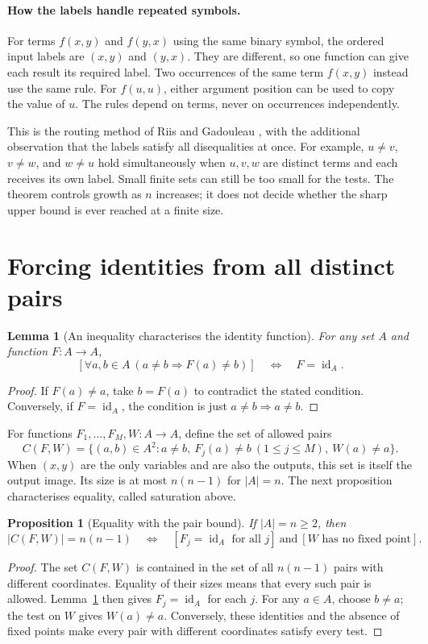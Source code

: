 \documentclass[12pt]{article}
\newtheorem{lemma}[theorem]{Lemma}
\newtheorem{proposition}[theorem]{Proposition}
\theoremstyle{definition}
\newcommand{\id}{\operatorname{id}}
\begin{document}
\paragraph{How the labels handle repeated symbols.}
For terms $f(x,y)$ and $f(y,x)$ using the same binary symbol, the
ordered input labels are $(x,y)$ and $(y,x)$. They are different, so
one function can give each result its required label. Two occurrences
of the same term $f(x,y)$ instead use the same rule. For $f(u,u)$,
either argument position can be used to copy the value of $u$.
The rules depend on terms, never on occurrences independently.

This is the routing method of Riis and Gadouleau \cite{RG}, with the
additional observation that the labels satisfy all disequalities at
once. For example, $u\ne v$, $v\ne w$, and $w\ne u$ hold simultaneously
when $u,v,w$ are distinct terms and each receives its own label.
Small finite sets can still be too small for the tests. The theorem
controls growth as $n$ increases; it does not decide whether the sharp
upper bound is ever reached at a finite size.
\section{Forcing identities from all distinct pairs}

\begin{lemma}[An inequality characterises the identity function]\label{lem:avoid}
For any set $A$ and function $F:A\to A$,
\[
 [\forall a,b\in A\ (a\ne b\Rightarrow F(a)\ne b)]
 \quad\Longleftrightarrow\quad F=\id_A.
\]
\end{lemma}
\begin{proof}
If $F(a)\ne a$, take $b=F(a)$ to contradict the stated condition.
Conversely, if $F=\id_A$, the condition is just $a\ne b\Rightarrow a\ne b$.
\end{proof}

For functions $F_1,\ldots,F_M,W:A\to A$, define the set of allowed pairs
\[
 C(F,W)=\{(a,b)\in A^2:a\ne b,\ F_j(a)\ne b\ (1\le j\le M),\ W(a)\ne a\}.
\]
When $(x,y)$ are the only variables and are also the outputs, this set
is itself the output image. Its size is at most $n(n-1)$ for $|A|=n$.
The next proposition characterises equality, called saturation above.

\begin{proposition}[Equality with the pair bound]\label{prop:saturation}
If $|A|=n\ge2$, then
\[
 |C(F,W)|=n(n-1)
 \quad\Longleftrightarrow\quad
 [F_j=\id_A\text{ for all }j]\ \text{and}\ [W\text{ has no fixed point}].
\]
\end{proposition}
\begin{proof}
The set $C(F,W)$ is contained in the set of all $n(n-1)$ pairs with
different coordinates. Equality of their sizes means that every such
pair is allowed. Lemma~\ref{lem:avoid} then gives $F_j=\id_A$ for
each $j$. For any $a\in A$, choose $b\ne a$; the test on $W$ gives
$W(a)\ne a$. Conversely, these identities and the absence of fixed
points make every pair with different coordinates satisfy every test.
\end{proof}
\end{document}
